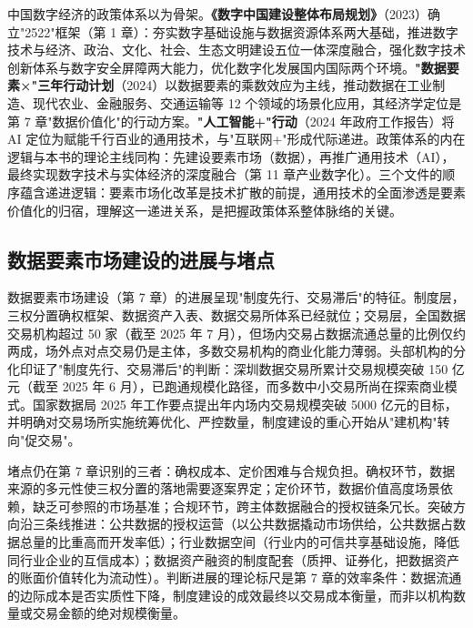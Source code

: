 中国数字经济的政策体系以为骨架。\textbf{《数字中国建设整体布局规划》}（2023）确立"2522"框架（第 1 章）：夯实数字基础设施与数据资源体系两大基础，推进数字技术与经济、政治、文化、社会、生态文明建设五位一体深度融合，强化数字技术创新体系与数字安全屏障两大能力，优化数字化发展国内国际两个环境。\textbf{"数据要素×"三年行动计划}（2024）以数据要素的乘数效应为主线，推动数据在工业制造、现代农业、金融服务、交通运输等 12 个领域的场景化应用，其经济学定位是第 7 章"数据价值化"的行动方案。\textbf{"人工智能+"行动}（2024 年政府工作报告）将 AI 定位为赋能千行百业的通用技术，与"互联网+"形成代际递进。政策体系的内在逻辑与本书的理论主线同构：先建设要素市场（数据），再推广通用技术（AI），最终实现数字技术与实体经济的深度融合（第 11 章产业数字化）。三个文件的顺序蕴含递进逻辑：要素市场化改革是技术扩散的前提，通用技术的全面渗透是要素价值化的归宿，理解这一递进关系，是把握政策体系整体脉络的关键。

\subsection{数据要素市场建设的进展与堵点}

数据要素市场建设（第 7 章）的进展呈现"制度先行、交易滞后"的特征。制度层，三权分置确权框架、数据资产入表、数据交易所体系已经就位；交易层，全国数据交易机构超过 50 家（截至 2025 年 7 月），但场内交易占数据流通总量的比例仅约两成，场外点对点交易仍是主体，多数交易机构的商业化能力薄弱。头部机构的分化印证了"制度先行、交易滞后"的判断：深圳数据交易所累计交易规模突破 150 亿元（截至 2025 年 6 月），已跑通规模化路径，而多数中小交易所尚在探索商业模式。国家数据局 2025 年工作要点提出年内场内交易规模突破 5000 亿元的目标，并明确对交易场所实施统筹优化、严控数量，制度建设的重心开始从"建机构"转向"促交易"。

堵点仍在第 7 章识别的三者：确权成本、定价困难与合规负担。确权环节，数据来源的多元性使三权分置的落地需要逐案界定；定价环节，数据价值高度场景依赖，缺乏可参照的市场基准；合规环节，跨主体数据融合的授权链条冗长。突破方向沿三条线推进：公共数据的授权运营（以公共数据撬动市场供给，公共数据占数据总量的比重高而开发率低）；行业数据空间（行业内的可信共享基础设施，降低同行业企业的互信成本）；数据资产融资的制度配套（质押、证券化，把数据资产的账面价值转化为流动性）。判断进展的理论标尺是第 7 章的效率条件：数据流通的边际成本是否实质性下降，制度建设的成效最终以交易成本衡量，而非以机构数量或交易金额的绝对规模衡量。

